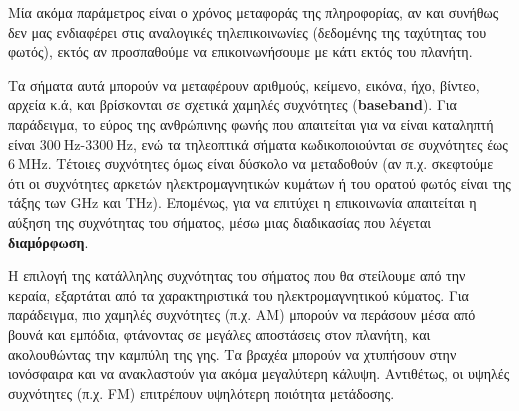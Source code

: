 \documentclass[11pt,a4paper,notitlepage,fleqn]{article}
\begin{document}
Μία ακόμα παράμετρος είναι ο χρόνος μεταφοράς της πληροφορίας, αν και συνήθως δεν μας
ενδιαφέρει στις αναλογικές τηλεπικοινωνίες (δεδομένης της ταχύτητας του φωτός), εκτός
αν προσπαθούμε να επικοινωνήσουμε με κάτι εκτός του πλανήτη.

Τα σήματα αυτά μπορούν να μεταφέρουν αριθμούς, κείμενο, εικόνα, ήχο, βίντεο, αρχεία κ.ά, και
βρίσκονται σε σχετικά χαμηλές συχνότητες (\textbf{baseband}). Για παράδειγμα, το εύρος της ανθρώπινης φωνής που
απαιτείται για να είναι καταληπτή είναι \( 300 \ \mathrm{Hz} \)-\( 3300\ \mathrm{Hz} \), ενώ
τα τηλεοπτικά σήματα κωδικοποιούνται σε συχνότητες έως \( 6 \ \mathrm{MHz} \). Τέτοιες
συχνότητες όμως είναι δύσκολο να μεταδοθούν (αν π.χ. σκεφτούμε ότι οι συχνότητες αρκετών
ηλεκτρομαγνητικών κυμάτων ή του ορατού φωτός είναι της τάξης των \( \mathrm{GHz} \) και
\( \mathrm{THz} \)). Επομένως, για να επιτύχει η επικοινωνία απαιτείται η αύξηση της
συχνότητας του σήματος, μέσω μιας διαδικασίας που λέγεται \textbf{διαμόρφωση}.


Η επιλογή της κατάλληλης συχνότητας του σήματος που θα στείλουμε από την κεραία, εξαρτάται
από τα χαρακτηριστικά του ηλεκτρομαγνητικού κύματος. Για παράδειγμα, πιο χαμηλές συχνότητες
(π.χ. AM) μπορούν να περάσουν μέσα από βουνά και εμπόδια, φτάνοντας σε μεγάλες αποστάσεις
στον πλανήτη, και ακολουθώντας την καμπύλη της γης. Τα βραχέα μπορούν να χτυπήσουν στην
ιονόσφαιρα και να ανακλαστούν για ακόμα μεγαλύτερη κάλυψη. Αντιθέτως, οι υψηλές συχνότητες
(π.χ. FM) επιτρέπουν υψηλότερη ποιότητα μετάδοσης.
\end{document}
